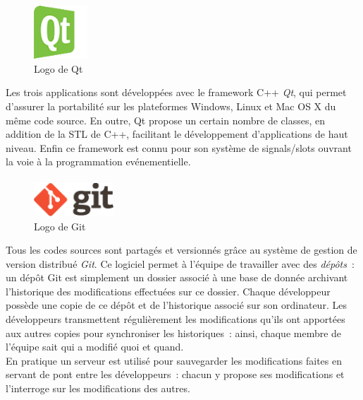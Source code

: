 \paragraph{}
\begin{figure}
  \centering
  \includegraphics[width=2cm]{images/qt-logo.png}
  \caption{Logo de Qt}
\end{figure}
Les trois applications sont  
développées avec le framework C++ \emph{Qt}, qui permet d'assurer la portabilité sur les 
plateformes Windows, Linux et Mac OS X du même code source. En outre, Qt
propose un certain nombre de classes, en addition de la STL de C++, facilitant le
développement d'applications de haut niveau. Enfin ce framework est connu pour son
système de signals/slots ouvrant la voie à la programmation evénementielle.\cite{qt}
\paragraph{}
\begin{figure}
  \centering
  \includegraphics[width=3cm]{images/git-logo.png}
  \caption{Logo de Git}
\end{figure}
Tous les codes sources sont partagés et versionnés grâce au système de gestion de version 
distribué \emph{Git}\cite{gestion-versions}. Ce logiciel permet à l'équipe de travailler
avec des \emph{dépôts}~: un dépôt Git est simplement un dossier associé à une base
de donnée archivant l'historique des modifications effectuées sur ce dossier. Chaque développeur
possède une copie de ce dépôt et de l'historique associé sur son ordinateur. Les développeurs
transmettent régulièrement les modifications qu'ils ont apportées aux autres copies pour synchroniser
les historiques~: ainsi, chaque membre de l'équipe sait qui a modifié quoi et quand.\\
En pratique un serveur est utilisé pour sauvegarder les modifications faites en
servant de pont entre les développeurs~: chacun y propose ses modifications et l'interroge
sur les modifications des autres.
